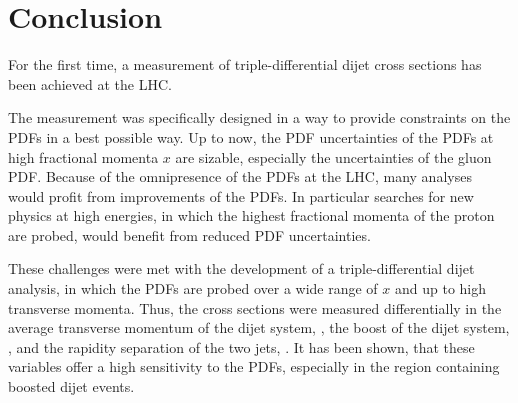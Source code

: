 
\chapter{Conclusion}

For the first time, a measurement of triple-differential dijet cross sections
has been achieved at the LHC. 

The measurement was specifically designed in a way to provide constraints on the
PDFs in a best possible way. Up to now, the PDF uncertainties of the PDFs at
high fractional momenta $x$ are sizable, especially the uncertainties of the gluon PDF. 
Because of the omnipresence of the PDFs at the LHC, many analyses would profit
from improvements of the PDFs. In particular searches for new physics at high
energies, in which the highest fractional momenta of the proton are probed,
would benefit from reduced PDF uncertainties.

These challenges were met with the development of a triple-differential dijet
analysis, in which the PDFs are probed over a wide range of $x$ and up to high
transverse momenta. Thus, the cross sections were measured
differentially in the average transverse momentum of the dijet system, \ptavg,
the boost of the dijet system, \yboost, and the rapidity separation of the
two jets, \ystar. It has been shown, that these variables offer a high sensitivity to
the PDFs, especially in the region containing boosted dijet events.

